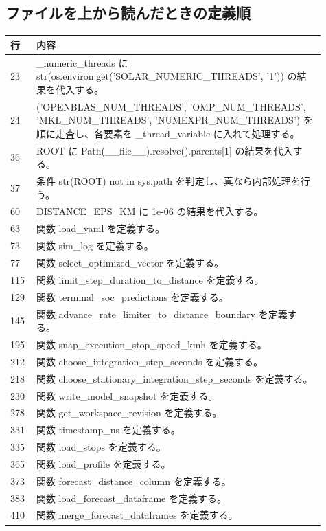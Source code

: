 \documentclass[a4paper,11pt]{article}
\begin{document}
        \subsection*{ファイルを上から読んだときの定義順}
            \begin{longtable}{p{0.07\linewidth} p{0.84\linewidth}}
            \toprule
            行 & 内容 \\
            \midrule
            23 & \_numeric\_threads に str(os.environ.get('SOLAR\_NUMERIC\_THREADS', '1')) の結果を代入する。 \\
24 & ('OPENBLAS\_NUM\_THREADS', 'OMP\_NUM\_THREADS', 'MKL\_NUM\_THREADS', 'NUMEXPR\_NUM\_THREADS') を順に走査し、各要素を \_thread\_variable に入れて処理する。 \\
36 & ROOT に Path(\_\_file\_\_).resolve().parents[1] の結果を代入する。 \\
37 & 条件 str(ROOT) not in sys.path を判定し、真なら内部処理を行う。 \\
60 & DISTANCE\_EPS\_KM に 1e-06 の結果を代入する。 \\
63 & 関数 load\_yaml を定義する。 \\
73 & 関数 sim\_log を定義する。 \\
77 & 関数 select\_optimized\_vector を定義する。 \\
115 & 関数 limit\_step\_duration\_to\_distance を定義する。 \\
129 & 関数 terminal\_soc\_predictions を定義する。 \\
145 & 関数 advance\_rate\_limiter\_to\_distance\_boundary を定義する。 \\
195 & 関数 snap\_execution\_stop\_speed\_kmh を定義する。 \\
212 & 関数 choose\_integration\_step\_seconds を定義する。 \\
218 & 関数 choose\_stationary\_integration\_step\_seconds を定義する。 \\
230 & 関数 write\_model\_snapshot を定義する。 \\
278 & 関数 get\_workspace\_revision を定義する。 \\
331 & 関数 timestamp\_ns を定義する。 \\
335 & 関数 load\_stops を定義する。 \\
365 & 関数 load\_profile を定義する。 \\
373 & 関数 forecast\_distance\_column を定義する。 \\
383 & 関数 load\_forecast\_dataframe を定義する。 \\
410 & 関数 merge\_forecast\_dataframes を定義する。 \\

\end{longtable}
\end{document}
